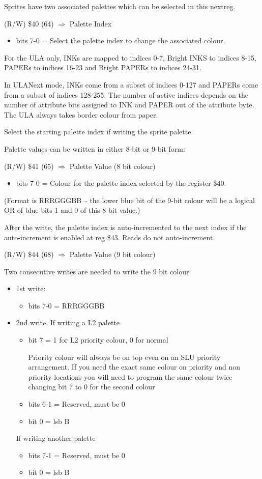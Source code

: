 Sprites have two associated palettes which can be selected in this nextreg.

(R/W) \$40 (64) $\Rightarrow$ Palette Index
\begin{itemize}
\item[] bits 7-0 = Select the palette index to change the associated
  colour.
\end{itemize}
For the ULA only, INKs are mapped to indices 0-7, Bright INKS to
indices 8-15, PAPERs to indices 16-23 and Bright PAPERs to indices
24-31.

In ULANext mode, INKs come from a subset of indices 0-127 and PAPERs
come from a subset of indices 128-255. The number of active indices
depends on the number of attribute bits assigned to INK and PAPER out
of the attribute byte.  The ULA always takes border colour from paper.

Select the starting palette index if writing the sprite palette.

Palette values can be written in either 8-bit or 9-bit form:

(R/W) \$41 (65) $\Rightarrow$ Palette Value (8 bit colour)
\begin{itemize}
\item[] bits 7-0 = Colour for the palette index selected by the register \$40.
\end{itemize}
(Format is RRRGGGBB – the lower blue bit of the 9-bit colour will be a
logical OR of blue bits 1 and 0 of this 8-bit value.)

After the write, the palette index is auto-incremented to the next
index if the auto-increment is enabled at reg \$43. Reads do not
auto-increment.

(R/W) \$44 (68) $\Rightarrow$ Palette Value (9 bit colour)

Two consecutive writes are needed to write the 9 bit colour
\begin{itemize}
\item[] 1st write:
  \begin{itemize}
  \item[] bits 7-0 = RRRGGGBB
  \end{itemize}
\item[] 2nd write.
  If writing a L2 palette
  \begin{itemize}
  \item[] bit 7 = 1 for L2 priority colour, 0 for normal

    Priority colour will always be on top even on an SLU priority
    arrangement. If you need the exact same colour on priority and non
    priority locations you will need to program the same colour twice
    changing bit 7 to 0 for the second colour
  \item[] bits 6-1 = Reserved, must be 0
  \item[] bit 0 = lsb B
  \end{itemize}
  
  If writing another palette
  \begin{itemize}
  \item[] bits 7-1 = Reserved, must be 0
  \item[] bit 0 = lsb B
  \end{itemize}
\end{itemize}


